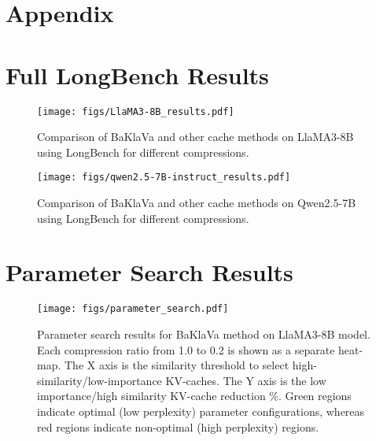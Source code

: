 \section{Appendix}
\appendix

\section{Full LongBench Results}

 \begin{figure*}[!htb]
     \centering
     \texttt{[image: figs/LlaMA3-8B\_results.pdf]}
     \caption{Comparison of BaKlaVa and other cache methods on LlaMA3-8B using LongBench for different compressions.}
     \label{fig:longbench_results_llama}
 \end{figure*}

 \begin{figure*}[!htb]
     \centering
     \texttt{[image: figs/qwen2.5-7B-instruct\_results.pdf]}
     \caption{Comparison of BaKlaVa and other cache methods on Qwen2.5-7B using LongBench for different compressions.}
     \label{fig:longbench_results_qwen}
 \end{figure*}


 
\section{Parameter Search Results}
\begin{figure*}[!htb]
    \centering
    \texttt{[image: figs/parameter\_search.pdf]}
    \caption{Parameter search results for BaKlaVa method on LlaMA3-8B model. Each compression ratio from 1.0 to 0.2 is shown as a separate heat-map. The X axis is the similarity threshold to select high-similarity/low-importance KV-caches. The Y axis is the low importance/high similarity KV-cache reduction \%. Green regions indicate optimal (low perplexity) parameter configurations, whereas red regions indicate non-optimal (high perplexity) regions. }
    \label{fig:enter-label}
\end{figure*}